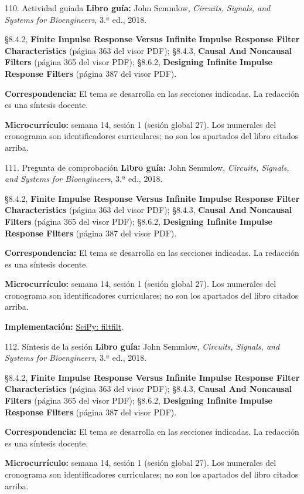 \documentclass[
  10pt,
  ignorenonframetext,
  aspectratio=169,
  spanish,
]{beamer}
\begin{document}
\begin{frame}{110. Actividad guiada}
\label{actividad-guiada-6}
\textbf{Libro guía:} John Semmlow, \emph{Circuits, Signals, and Systems
for Bioengineers}, 3.ª ed., 2018.

§8.4.2, \textbf{Finite Impulse Response Versus Infinite Impulse Response
Filter Characteristics} (página 363 del visor PDF); §8.4.3,
\textbf{Causal And Noncausal Filters} (página 365 del visor PDF);
§8.6.2, \textbf{Designing Infinite Impulse Response Filters} (página 387
del visor PDF).

\textbf{Correspondencia:} El tema se desarrolla en las secciones
indicadas. La redacción es una síntesis docente.

\textbf{Microcurrículo:} semana 14, sesión 1 (sesión global 27). Los
numerales del cronograma son identificadores curriculares; no son los
apartados del libro citados arriba.
\end{frame}

\begin{frame}{111. Pregunta de comprobación}
\label{pregunta-de-comprobaciuxf3n-6}
\textbf{Libro guía:} John Semmlow, \emph{Circuits, Signals, and Systems
for Bioengineers}, 3.ª ed., 2018.

§8.4.2, \textbf{Finite Impulse Response Versus Infinite Impulse Response
Filter Characteristics} (página 363 del visor PDF); §8.4.3,
\textbf{Causal And Noncausal Filters} (página 365 del visor PDF);
§8.6.2, \textbf{Designing Infinite Impulse Response Filters} (página 387
del visor PDF).

\textbf{Correspondencia:} El tema se desarrolla en las secciones
indicadas. La redacción es una síntesis docente.

\textbf{Microcurrículo:} semana 14, sesión 1 (sesión global 27). Los
numerales del cronograma son identificadores curriculares; no son los
apartados del libro citados arriba.

\textbf{Implementación:}
\href{https://docs.scipy.org/doc/scipy/reference/generated/scipy.signal.filtfilt.html}{SciPy:
filtfilt}.
\end{frame}

\begin{frame}{112. Síntesis de la sesión}
\label{suxedntesis-de-la-sesiuxf3n-6}
\textbf{Libro guía:} John Semmlow, \emph{Circuits, Signals, and Systems
for Bioengineers}, 3.ª ed., 2018.

§8.4.2, \textbf{Finite Impulse Response Versus Infinite Impulse Response
Filter Characteristics} (página 363 del visor PDF); §8.4.3,
\textbf{Causal And Noncausal Filters} (página 365 del visor PDF);
§8.6.2, \textbf{Designing Infinite Impulse Response Filters} (página 387
del visor PDF).

\textbf{Correspondencia:} El tema se desarrolla en las secciones
indicadas. La redacción es una síntesis docente.

\textbf{Microcurrículo:} semana 14, sesión 1 (sesión global 27). Los
numerales del cronograma son identificadores curriculares; no son los
apartados del libro citados arriba.
\end{frame}
\end{document}
